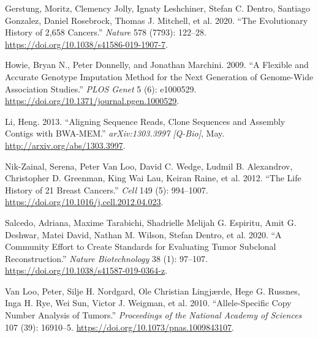 \documentclass[]{article}
\begin{document}
\leavevmode\hypertarget{ref-gerstung_evolutionary_2020}{}%
Gerstung, Moritz, Clemency Jolly, Ignaty Leshchiner, Stefan C. Dentro,
Santiago Gonzalez, Daniel Rosebrock, Thomas J. Mitchell, et al. 2020.
``The Evolutionary History of 2,658 Cancers.'' \emph{Nature} 578 (7793):
122--28. \url{https://doi.org/10.1038/s41586-019-1907-7}.

\leavevmode\hypertarget{ref-howie_flexible_2009}{}%
Howie, Bryan N., Peter Donnelly, and Jonathan Marchini. 2009. ``A
Flexible and Accurate Genotype Imputation Method for the Next Generation
of Genome-Wide Association Studies.'' \emph{PLOS Genet} 5 (6): e1000529.
\url{https://doi.org/10.1371/journal.pgen.1000529}.

\leavevmode\hypertarget{ref-li_aligning_2013}{}%
Li, Heng. 2013. ``Aligning Sequence Reads, Clone Sequences and Assembly
Contigs with BWA-MEM.'' \emph{arXiv:1303.3997 {[}Q-Bio{]}}, May.
\url{http://arxiv.org/abs/1303.3997}.

\leavevmode\hypertarget{ref-nik-zainal_life_2012}{}%
Nik-Zainal, Serena, Peter Van Loo, David C. Wedge, Ludmil B. Alexandrov,
Christopher D. Greenman, King Wai Lau, Keiran Raine, et al. 2012. ``The
Life History of 21 Breast Cancers.'' \emph{Cell} 149 (5): 994--1007.
\url{https://doi.org/10.1016/j.cell.2012.04.023}.

\leavevmode\hypertarget{ref-salcedo_community_2020}{}%
Salcedo, Adriana, Maxime Tarabichi, Shadrielle Melijah G. Espiritu, Amit
G. Deshwar, Matei David, Nathan M. Wilson, Stefan Dentro, et al. 2020.
``A Community Effort to Create Standards for Evaluating Tumor Subclonal
Reconstruction.'' \emph{Nature Biotechnology} 38 (1): 97--107.
\url{https://doi.org/10.1038/s41587-019-0364-z}.

\leavevmode\hypertarget{ref-van_loo_allele-specific_2010}{}%
Van Loo, Peter, Silje H. Nordgard, Ole Christian Lingjærde, Hege G.
Russnes, Inga H. Rye, Wei Sun, Victor J. Weigman, et al. 2010.
``Allele-Specific Copy Number Analysis of Tumors.'' \emph{Proceedings of
the National Academy of Sciences} 107 (39): 16910--5.
\url{https://doi.org/10.1073/pnas.1009843107}.
\end{document}
